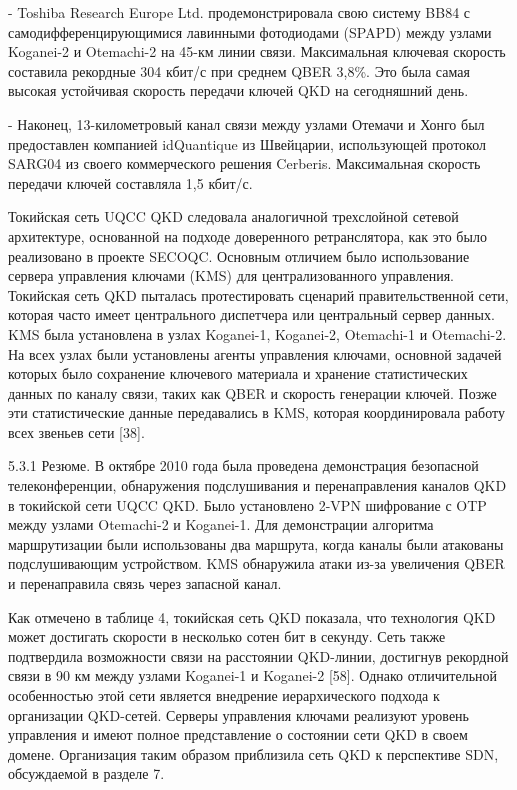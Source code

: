 - Toshiba Research Europe Ltd. продемонстрировала свою систему BB84 с самодифференцирующимися лавинными фотодиодами (SPAPD) между узлами Koganei-2 и Otemachi-2 на 45-км линии связи. Максимальная ключевая скорость составила рекордные 304 кбит/с при среднем QBER 3,8\%. Это была самая высокая устойчивая скорость передачи ключей QKD на сегодняшний день.

- Наконец, 13-километровый канал связи между узлами Отемачи и Хонго был предоставлен компанией idQuantique из Швейцарии, использующей протокол SARG04 из своего коммерческого решения Cerberis. Максимальная скорость передачи ключей составляла 1,5 кбит/с.

Токийская сеть UQCC QKD следовала аналогичной трехслойной сетевой архитектуре, основанной на подходе доверенного ретранслятора, как это было реализовано в проекте SECOQC. Основным отличием было использование сервера управления ключами (KMS) для централизованного управления. Токийская сеть QKD пыталась протестировать сценарий правительственной сети, которая часто имеет центрального диспетчера или центральный сервер данных. KMS была установлена в узлах Koganei-1, Koganei-2, Otemachi-1 и Otemachi-2. На всех узлах были установлены агенты управления ключами, основной задачей которых было сохранение ключевого материала и хранение статистических данных по каналу связи, таких как QBER и скорость генерации ключей. Позже эти статистические данные передавались в KMS, которая координировала работу всех звеньев сети [38].

5.3.1 Резюме. В октябре 2010 года была проведена демонстрация безопасной телеконференции, обнаружения подслушивания и перенаправления каналов QKD в токийской сети UQCC QKD. 
Было установлено 2-VPN шифрование с OTP между узлами Otemachi-2 и Koganei-1. Для демонстрации алгоритма маршрутизации были использованы два маршрута, когда каналы были атакованы подслушивающим устройством. KMS обнаружила атаки из-за увеличения QBER и перенаправила связь через запасной канал.

Как отмечено в таблице 4, токийская сеть QKD показала, что технология QKD может достигать скорости в несколько сотен бит в секунду. Сеть также подтвердила возможности связи на расстоянии QKD-линии, достигнув рекордной связи в 90 км между узлами Koganei-1 и Koganei-2 [58]. Однако отличительной особенностью этой сети является внедрение иерархического подхода к организации QKD-сетей. Серверы управления ключами реализуют уровень управления и имеют полное представление о состоянии сети QKD в своем домене. Организация таким образом приблизила сеть QKD к перспективе SDN, обсуждаемой в разделе 7.


